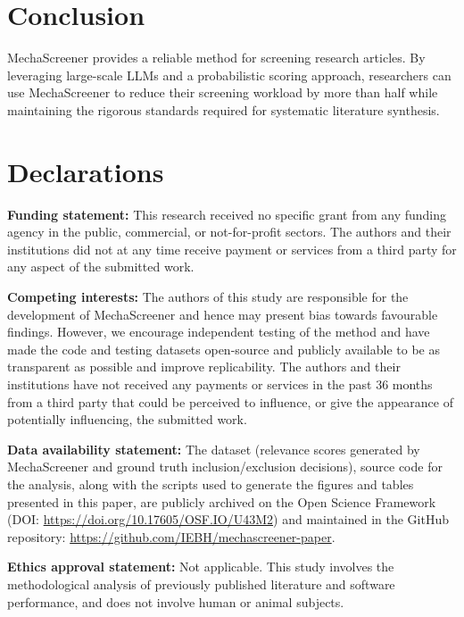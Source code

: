 \documentclass[11pt,a4paper]{article}
\begin{document}
\section{Conclusion}
MechaScreener provides a reliable method for screening research articles. By leveraging large-scale LLMs and a probabilistic scoring approach, researchers can use MechaScreener to reduce their screening workload by more than half while maintaining the rigorous standards required for systematic literature synthesis.

\section*{Declarations}

\noindent\textbf{Funding statement:}
This research received no specific grant from any funding agency in the public, commercial, or not-for-profit sectors. The authors and their institutions did not at any time receive payment or services from a third party for any aspect of the submitted work. \bigbreak

\noindent\textbf{Competing interests:}
The authors of this study are responsible for the development of MechaScreener and hence may present bias towards favourable findings. However, we encourage independent testing of the method and have made the code and testing datasets open-source and publicly available to be as transparent as possible and improve replicability. The authors and their institutions have not received any payments or services in the past 36 months from a third party that could be perceived to influence, or give the appearance of potentially influencing, the submitted work. \bigbreak

\noindent\textbf{Data availability statement:}
The dataset (relevance scores generated by MechaScreener and ground truth inclusion/exclusion decisions), source code for the analysis, along with the scripts used to generate the figures and tables presented in this paper, are publicly archived on the Open Science Framework (DOI: \url{https://doi.org/10.17605/OSF.IO/U43M2}) and maintained in the GitHub repository: \url{https://github.com/IEBH/mechascreener-paper}. \bigbreak

\noindent\textbf{Ethics approval statement:}
Not applicable. This study involves the methodological analysis of previously published literature and software performance, and does not involve human or animal subjects.



\end{document}
